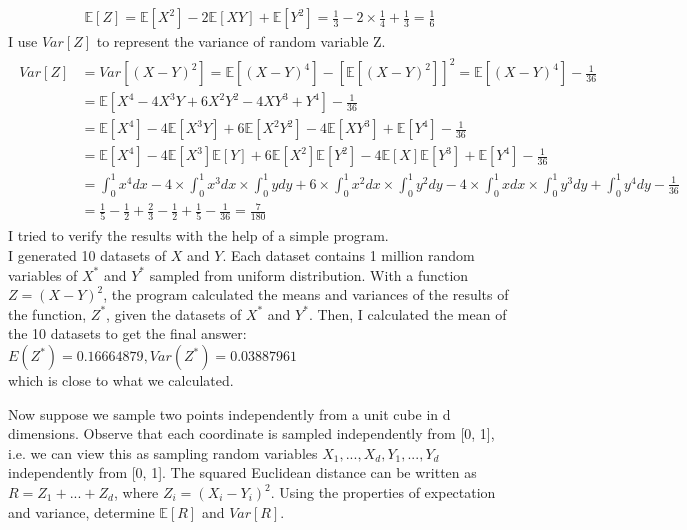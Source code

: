 \documentclass{myhw}
\begin{document}
\begin{homeworkProblem}
\begin{homeworkSection}
\begin{gather*}
\mathbb{E}[Z] = \mathbb{E}[X^2] - 2\mathbb{E}[XY] + \mathbb{E}[Y^2] = \frac{1}{3} - 2 \times \frac{1}{4} + \frac{1}{3} = \frac{1}{6}
\end{gather*}
I use $Var[Z]$ to represent the variance of random variable Z. 
\begin{gather*}
\begin{aligned}
Var[Z] &= Var[(X-Y)^2] = \mathbb{E}[(X-Y)^4] - [\mathbb{E}[(X-Y)^2]]^2 = \mathbb{E}[(X-Y)^4] - \frac{1}{36} \\
&= \mathbb{E}[X^4-4X^3Y+6X^2Y^2-4XY^3+Y^4] - \frac{1}{36} \\
&= \mathbb{E}[X^4]-4\mathbb{E}[X^3Y]+6\mathbb{E}[X^2Y^2]-4\mathbb{E}[XY^3]+\mathbb{E}[Y^4] - \frac{1}{36} \\
&= \mathbb{E}[X^4]-4\mathbb{E}[X^3]\mathbb{E}[Y]+6\mathbb{E}[X^2]\mathbb{E}[Y^2]-4\mathbb{E}[X]\mathbb{E}[Y^3]+\mathbb{E}[Y^4] - \frac{1}{36} \\
&= \int_{0}^{1}{x^4dx} - 4 \times \int_{0}^{1}{x^3dx} \times \int_{0}^{1}{ydy} + 
6 \times \int_{0}^{1}{x^2dx} \times \int_{0}^{1}{y^2dy} - 4 \times \int_{0}^{1}{xdx} \times \int_{0}^{1}{y^3dy} + 
\int_{0}^{1}{y^4dy} - \frac{1}{36} \\
&= \frac{1}{5} - \frac{1}{2} + \frac{2}{3} - \frac{1}{2} + \frac{1}{5} - \frac{1}{36} = \frac{7}{180}
\end{aligned}
\end{gather*}
I tried to verify the results with the help of a simple program. \\
I generated 10 datasets of $X$ and $Y$.
Each dataset contains 1 million random variables of $X^*$ and $Y^*$ sampled from uniform distribution.
With a function $Z = (X - Y)^2$, the program calculated the means and variances of the results of the function, $Z^*$, given the datasets of $X^*$ and $Y^*$. 
Then, I calculated the mean of the 10 datasets to get the final answer: \\
$E(Z^*)=0.16664879, Var(Z^*)=0.03887961$ \\
which is close to what we calculated.
\end{homeworkSection}
\begin{homeworkSection}
Now suppose we sample two points independently from a unit cube in d dimensions. Observe that each coordinate is sampled independently from [0, 1], i.e. we can view this as sampling random variables $X_1, ... , X_d, Y_1, . . . , Y_d$ independently from [0, 1]. The squared Euclidean distance can be written as $R = Z_1 + ... + Z_d$, where $Z_i = (X_i - Y_i)^2$. Using the properties of expectation and variance, determine $\mathbb{E}[R]$ and $Var[R]$. \\

\end{homeworkSection}
\end{homeworkProblem}
\end{document}
